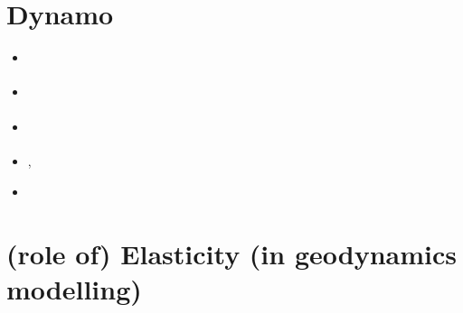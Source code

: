 \section{Dynamo}

\begin{scriptsize}
\begin{itemize}
\item[\twothousandfive] \textcite{haha05}
\item[\twothousandnine] \textcite{rolm09}
\item[\twothousandeleven] \textcite{jone11}
\item[\twothousandthirteen] \textcite{erhh13}, \textcite{vagc13}
\item[\twothousandsixteen] \textcite{chah16}
\end{itemize}
\end{scriptsize}

\section{(role of) Elasticity (in geodynamics modelling)}

